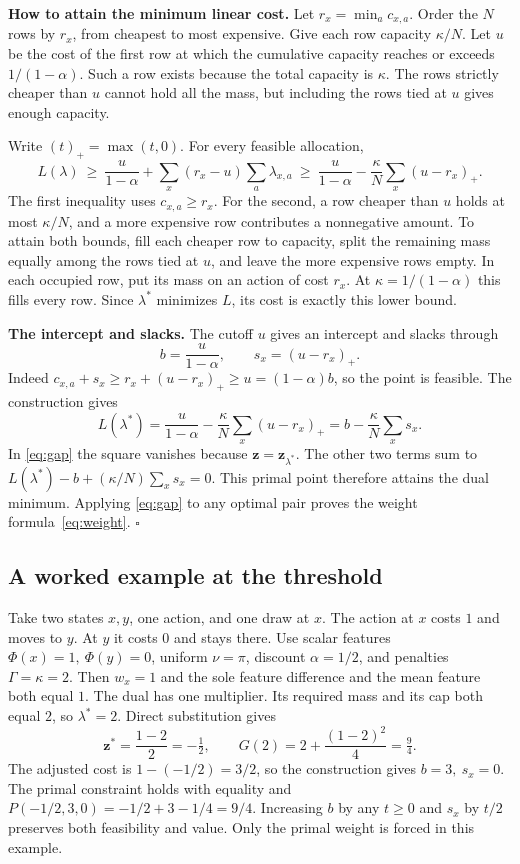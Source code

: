 \documentclass[12pt,a4paper]{article}
\numberwithin{equation}{section}
\newcommand{\lead}[1]{\par\smallskip\noindent\textbf{#1}\enspace}
\begin{document}
\lead{How to attain the minimum linear cost.}
Let \(r_x=\min_a c_{x,a}\). Order the \(N\) rows by \(r_x\), from cheapest
to most expensive. Give each row capacity \(\kappa/N\). Let \(u\) be the cost of the first row
at which the cumulative capacity reaches or exceeds \(1/(1-\alpha)\).
Such a row exists because the total capacity is \(\kappa\). The rows strictly
cheaper than \(u\) cannot hold all the mass, but including the rows tied at
\(u\) gives enough capacity.

Write \((t)_+=\max(t,0)\). For every feasible allocation,
\[
 L(\lambda)\ \ge\ \frac{u}{1-\alpha}+\sum_x(r_x-u)\sum_a\lambda_{x,a}
                  \ \ge\ \frac{u}{1-\alpha}-\frac{\kappa}{N}\sum_x(u-r_x)_+ .
\]
The first inequality uses \(c_{x,a}\ge r_x\). For the second, a row cheaper
than \(u\) holds at most \(\kappa/N\), and a more expensive row contributes a
nonnegative amount. To attain both bounds, fill each cheaper row to capacity,
split the remaining mass equally among the rows tied at \(u\), and leave
the more expensive rows empty. In each occupied row, put its mass on an action
of cost \(r_x\). At \(\kappa=1/(1-\alpha)\) this fills every row. Since \(\lambda^*\)
minimizes \(L\), its cost is exactly this lower bound.

\lead{The intercept and slacks.}
The cutoff \(u\) gives an intercept and slacks through
\[
               b=\frac{u}{1-\alpha},\qquad s_x=(u-r_x)_+ .
\]
Indeed \(c_{x,a}+s_x\ge r_x+(u-r_x)_+\ge u=(1-\alpha)b\), so the point is feasible.
The construction gives
\[
      L(\lambda^*)=\frac{u}{1-\alpha}-\frac{\kappa}{N}\sum_x(u-r_x)_+=b-\frac{\kappa}{N}\sum_x s_x .
\]
In \eqref{eq:gap} the square vanishes because \(\mathbf z=\mathbf z_{\lambda^*}\).
The other two terms sum to \(L(\lambda^*)-b+(\kappa/N)\sum_x s_x=0\).
This primal point therefore attains the dual minimum. Applying
\eqref{eq:gap} to any optimal pair proves the weight formula~\eqref{eq:weight}.
\hfill\(\square\)

\newpage
\subsection*{A worked example at the threshold}
Take two states \(x,y\), one action, and one draw at \(x\). The action at
\(x\) costs \(1\) and moves to \(y\). At \(y\) it costs \(0\) and stays
there. Use scalar features \(\Phi(x)=1,\ \Phi(y)=0\), uniform
\(\nu=\pi\), discount \(\alpha=1/2\), and penalties \(\Gamma=\kappa=2\).
Then \(w_x=1\) and the sole feature difference and the mean feature both
equal \(1\). The dual has one multiplier. Its required mass and its cap
both equal \(2\), so \(\lambda^*=2\). Direct substitution gives
\[
     \mathbf z^*=\frac{1-2}{2}=-\tfrac12,\qquad
     G(2)=2+\frac{(1-2)^2}{4}=\tfrac94 .
\]
The adjusted cost is \(1-(-1/2)=3/2\), so the construction gives
\(b=3,\ s_x=0\). The primal constraint holds with equality and
\(P(-1/2,3,0)=-1/2+3-1/4=9/4\).
Increasing \(b\) by any \(t\ge0\) and \(s_x\) by \(t/2\) preserves both
feasibility and value. Only the primal weight is forced in this example.
\end{document}
